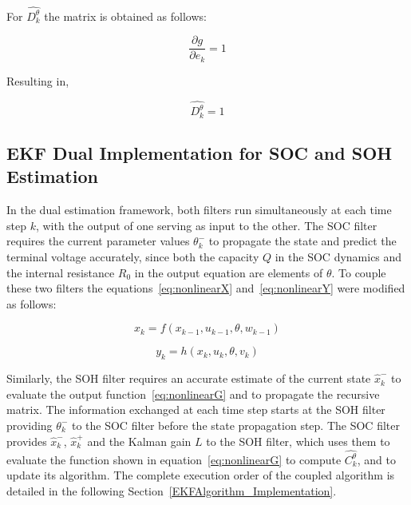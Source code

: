For $\hat{D_k^\theta}$ the matrix is obtained as follows:

\begin{equation}
    \frac{\partial g}{\partial e_k} = 1
    \label{eq:DthetaPartial}
\end{equation}

Resulting in,

\begin{equation}
    \hat{D_k^\theta} = 1
    \label{eq:DthetaResult}
\end{equation}

\subsection{EKF Dual Implementation for SOC and SOH Estimation}\label{dualEKF}

In the dual estimation framework, both filters run simultaneously at each time step $k$, with the output of one serving as input to the other.
The \acs{SOC} filter requires the current parameter values $\theta_k^-$ to propagate the state and predict the terminal voltage accurately, 
since both the capacity $Q$ in the \acs{SOC} dynamics and the internal resistance $R_0$ in the output equation are elements of $\theta$.
To couple these two filters the equations~\ref{eq:nonlinearX} and~\ref{eq:nonlinearY} were modified as follows:

\begin{equation}
    x_k = f(x_{k-1}, u_{k-1}, \theta, w_{k-1})
    \label{eq:DualnonlinearX}
\end{equation}

\begin{equation}
    y_k = h(x_k, u_k, \theta, v_k)
    \label{eq:DualnonlinearY}
\end{equation}

Similarly, the \acs{SOH} filter requires an accurate estimate of the current state $\hat{x}_k^-$ to evaluate the output function~\ref{eq:nonlinearG}
and to propagate the recursive matrix. The information exchanged at each time step starts at the \acs{SOH} filter providing $\theta_k^-$ to the
\acs{SOC} filter before the state propagation step. The \acs{SOC} filter provides $\hat{x}_k^-$, $\hat{x}_k^+$ and the Kalman gain $L$ to the \acs{SOH} filter,
which uses them to evaluate the function shown in equation~\ref{eq:nonlinearG} to compute $\hat{C_k^\theta}$, and to update its algorithm.
The complete execution order of the coupled algorithm is detailed in the following Section~\ref{EKFAlgorithm_Implementation}.

